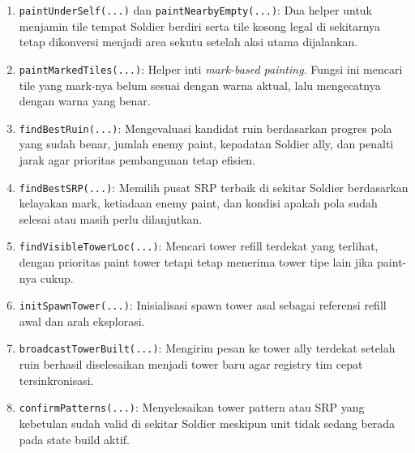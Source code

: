 \begin{enumerate}
	\item \texttt{paintUnderSelf(...)} dan \texttt{paintNearbyEmpty(...)}:
	      Dua helper untuk menjamin tile tempat Soldier berdiri serta tile kosong legal di sekitarnya tetap dikonversi menjadi area sekutu setelah aksi utama dijalankan.

	\item \texttt{paintMarkedTiles(...)}:
	      Helper inti \textit{mark-based painting}. Fungsi ini mencari tile yang mark-nya belum sesuai dengan warna aktual, lalu mengecatnya dengan warna yang benar.

	\item \texttt{findBestRuin(...)}:
	      Mengevaluasi kandidat ruin berdasarkan progres pola yang sudah benar, jumlah enemy paint, kepadatan Soldier ally, dan penalti jarak agar prioritas pembangunan tetap efisien.

	\item \texttt{findBestSRP(...)}:
	      Memilih pusat SRP terbaik di sekitar Soldier berdasarkan kelayakan mark, ketiadaan enemy paint, dan kondisi apakah pola sudah selesai atau masih perlu dilanjutkan.

	\item \texttt{findVisibleTowerLoc(...)}:
	      Mencari tower refill terdekat yang terlihat, dengan prioritas paint tower tetapi tetap menerima tower tipe lain jika paint-nya cukup.

	\item \texttt{initSpawnTower(...)}:
	      Inisialisasi spawn tower asal sebagai referensi refill awal dan arah eksplorasi.

	\item \texttt{broadcastTowerBuilt(...)}:
	      Mengirim pesan ke tower ally terdekat setelah ruin berhasil diselesaikan menjadi tower baru agar registry tim cepat tersinkronisasi.

	\item \texttt{confirmPatterns(...)}:
	      Menyelesaikan tower pattern atau SRP yang kebetulan sudah valid di sekitar Soldier meskipun unit tidak sedang berada pada state build aktif.
\end{enumerate}

